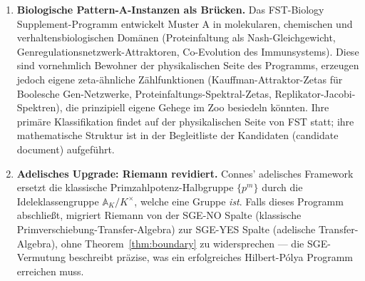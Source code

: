 \documentclass[11pt]{article}
\theoremstyle{definition}
\theoremstyle{remark}
\begin{document}
\begin{enumerate}
\begin{itemize}
  \item \textbf{Yang-Lee-Nullstellen}:\\[-0.6ex]
  ferromagnetische Partitionsfunktionen;
  konjektural fluss-nichtkompakt, \textbf{SGE-YES}. Temperatur als
  kontinuierlicher Parameter; das Lee-Yang Kreistheorem spielt die Rolle
  eines RH-Analogons. Statistisch-mechanischer Cousin von CRM.
  \item \textbf{Bost-Connes System} (1995): eine quantenstatistische
  Realisierung von $\zeta(s)$ als Partitionsfunktion mit spontaner
  Symmetriebrechung bei $\beta = 1$. Sitzt auf der Brücke zwischen den
  arithmetischen und Fluss-Klassen und verbindet den Zoo direkt mit
  Connes' adelischem Framework \cite{Connes1999, Connes2026}.
  \end{itemize}
  Jede dieser Familien verdient beizeiten ein eigenes FST-Mathematics Supplement.
  Eine zweite Ebene von zwölf weiteren Konstruktionen
  (Epstein, Witten-Zeta, Multiple-Zeta-Werte, Hurwitz, Lerch,
  Arakelov, motivische $L$-Funktionen, chirale Zeta, RG-Zetas, Gromov-Witten,
  Reidemeister-Torsion, QFT spektrale Zetas) und eine separate Spalte
  biologischer Muster-A-abgeleiteter Zetas (Kauffman-Attraktor,
  Proteinfaltungs-Spektren, Replikator-Jacobi-Spektren) sind in
  dem Begleit-Baumdokument katalogisiert \cite{CandidatesMasterList}.

\item \textbf{Biologische Pattern-A-Instanzen als Brücken.} Das
  FST-Biology Supplement-Programm \cite{FSTBiology} entwickelt
  Muster A in molekularen, chemischen und verhaltensbiologischen Domänen
  (Proteinfaltung als Nash-Gleichgewicht, Genregulationsnetzwerk-Attraktoren,
  Co-Evolution des Immunsystems). Diese sind vornehmlich
  Bewohner der physikalischen Seite des Programms, erzeugen jedoch
  eigene zeta-ähnliche Zählfunktionen (Kauffman-Attraktor-Zetas für Boolesche Gen-Netzwerke, Proteinfaltungs-Spektral-Zetas,
  Replikator-Jacobi-Spektren), die prinzipiell eigene
  Gehege im Zoo besiedeln könnten. Ihre primäre Klassifikation
  findet auf der physikalischen Seite von FST statt; ihre mathematische Struktur ist
  in der Begleitliste der Kandidaten (candidate document) aufgeführt.

\item \textbf{Adelisches Upgrade: Riemann revidiert.} Connes' adelisches
  Framework \cite{Connes1999, Connes2026} ersetzt die klassische
  Primzahlpotenz-Halbgruppe $\{p^m\}$ durch die Ideleklassengruppe
  $\mathbb{A}_K/K^\times$, welche eine Gruppe \emph{ist}. Falls dieses
  Programm abschließt, migriert Riemann von der SGE-NO Spalte
  (klassische Primverschiebung-Transfer-Algebra) zur SGE-YES Spalte
  (adelische Transfer-Algebra), ohne Theorem~\ref{thm:boundary} zu widersprechen ---
  die SGE-Vermutung beschreibt
  präzise, was ein erfolgreiches Hilbert-P\'olya Programm
  erreichen muss.


\end{enumerate}
\end{document}

